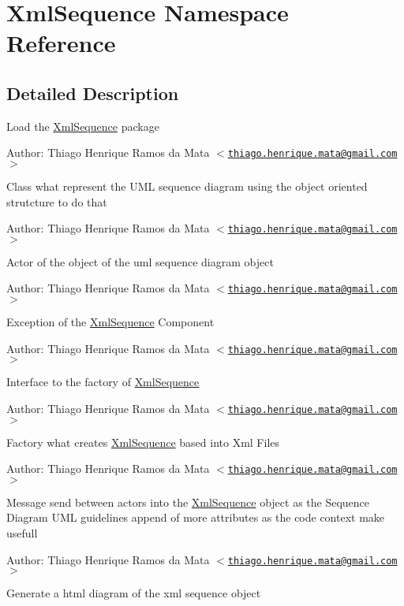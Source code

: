 \hypertarget{namespace_xml_sequence}{
\section{XmlSequence Namespace Reference}
\label{namespace_xml_sequence}
}


\subsection{Detailed Description}
Load the \hyperlink{class_xml_sequence}{XmlSequence} package \begin{Desc}
\item[Author:]Thiago Henrique Ramos da Mata $<$\href{mailto:thiago.henrique.mata@gmail.com}{\tt thiago.henrique.mata@gmail.com}$>$\end{Desc}
Class what represent the UML sequence diagram using the object oriented strutcture to do that

\begin{Desc}
\item[Author:]Thiago Henrique Ramos da Mata $<$\href{mailto:thiago.henrique.mata@gmail.com}{\tt thiago.henrique.mata@gmail.com}$>$\end{Desc}
Actor of the object of the uml sequence diagram object \begin{Desc}
\item[Author:]Thiago Henrique Ramos da Mata $<$\href{mailto:thiago.henrique.mata@gmail.com}{\tt thiago.henrique.mata@gmail.com}$>$\end{Desc}
Exception of the \hyperlink{class_xml_sequence}{XmlSequence} Component \begin{Desc}
\item[Author:]Thiago Henrique Ramos da Mata $<$\href{mailto:thiago.henrique.mata@gmail.com}{\tt thiago.henrique.mata@gmail.com}$>$\end{Desc}
Interface to the factory of \hyperlink{class_xml_sequence}{XmlSequence} \begin{Desc}
\item[Author:]Thiago Henrique Ramos da Mata $<$\href{mailto:thiago.henrique.mata@gmail.com}{\tt thiago.henrique.mata@gmail.com}$>$\end{Desc}
Factory what creates \hyperlink{class_xml_sequence}{XmlSequence} based into Xml Files \begin{Desc}
\item[Author:]Thiago Henrique Ramos da Mata $<$\href{mailto:thiago.henrique.mata@gmail.com}{\tt thiago.henrique.mata@gmail.com}$>$\end{Desc}
Message send between actors into the \hyperlink{class_xml_sequence}{XmlSequence} object as the Sequence Diagram UML guidelines append of more attributes as the code context make usefull \begin{Desc}
\item[Author:]Thiago Henrique Ramos da Mata $<$\href{mailto:thiago.henrique.mata@gmail.com}{\tt thiago.henrique.mata@gmail.com}$>$\end{Desc}
Generate a html diagram of the xml sequence object

